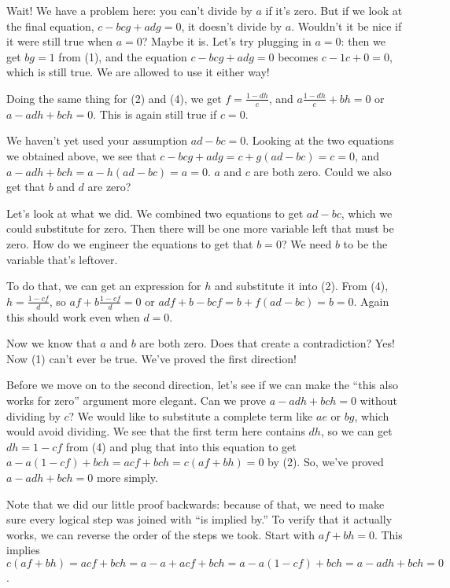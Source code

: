 \documentclass[11pt]{article}
\begin{document}
    Wait! We have a problem here: you can't divide by $a$ if it's zero. But if we look at
    the final equation, $c-bcg+adg=0$, it doesn't divide by $a$. Wouldn't it be
    nice if it were still true when $a=0$? Maybe it is. Let's try plugging in $a=0$:
    then we get $bg=1$ from (1), and the equation $c-bcg+adg=0$ becomes $c-1c+0=0$,
    which is still true. We are allowed to use it either way!
    
    Doing the same thing for (2) and (4), we get $f=\frac{1-dh}c$, and
    $a\frac{1-dh}c+bh=0$ or $a-adh+bch=0$. This is again still true if $c=0$.
    
    We haven't yet used your assumption $ad-bc=0$. Looking at the two equations we obtained
    above, we see that $c-bcg+adg=c+g(ad-bc)=c=0$, and $a-adh+bch=a-h(ad-bc)=a=0$.
    $a$ and $c$ are both zero. Could we also get that $b$ and $d$ are zero?
    
    Let's look at what we did. We combined two equations to get $ad-bc$, which we could
    substitute for zero. Then there will be one more variable left that must be zero.
    How do we engineer the equations to get that $b=0$? We need $b$ to be the variable
    that's leftover.
    
    To do that, we can get an expression for $h$ and substitute it into (2). From (4),
    $h=\frac{1-cf}d$, so $af+b\frac{1-cf}d=0$ or $adf+b-bcf=b+f(ad-bc)=b=0$. Again this
    should work even when $d=0$.
    
    Now we know that $a$ and $b$ are both zero. Does that create a contradiction?
    Yes! Now (1) can't ever be true. We've proved the first direction!
    
    Before we move on to the second direction, let's see if we can make the ``this also
    works for zero'' argument more elegant. Can we prove $a-adh+bch=0$ without dividing
    by $c$? We would like to substitute a complete term like $ae$ or $bg$, which would
    avoid dividing. We see that the first term here contains $dh$, so we can get
    $dh=1-cf$ from (4) and plug that into this equation to get $a-a(1-cf)+bch=acf+bch
    =c(af+bh)=0$ by (2). So, we've proved $a-adh+bch=0$ more simply.
    
    Note that we did our little proof backwards: because of that, we need to make sure
    every logical step was joined with ``is implied by.'' To verify that it actually works,
    we can reverse the order of the steps we took. Start with $af+bh=0$. This implies
    $c(af+bh)=acf+bch=a-a+acf+bch=a-a(1-cf)+bch=a-adh+bch=0$.
    
\end{document}
